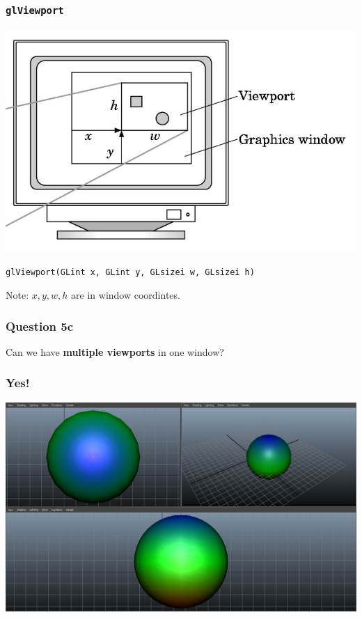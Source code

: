 \documentclass{beamer}
\begin{document}
\begin{frame}
    \frametitle{\texttt{glViewport}}

    \begin{center}
        \includegraphics[scale=0.3]{viewport.png}
    \end{center}

    \begin{tcolorbox}
        \begin{center}
            \texttt{glViewport(GLint x, GLint y, GLsizei w, GLsizei h)}
        \end{center}
    \end{tcolorbox}

    Note: $x,y,w,h$ are in window coordintes.

\end{frame}

\begin{frame}
    \frametitle{Question 5c}

    Can we have \textbf{multiple viewports} in one window?
\end{frame}

\begin{frame}
    \frametitle{Yes!}

    \begin{center}
        \includegraphics[scale=0.3]{multiple-viewports.png}
    \end{center}

\end{frame}
\end{document}
